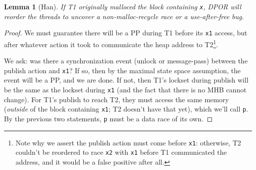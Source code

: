 \documentclass[pldi]{sigplanconf-pldi15}
\newtheorem{lemma}{Lemma}
\begin{document}
\begin{lemma}[Han]
	If T1 originally malloced the block containing {\tt x}, DPOR will reorder the threads to uncover a non-malloc-recycle race or a use-after-free bug.
	\label{lem:han}
\end{lemma}

\begin{proof}
We must guarantee there will be a PP during T1 before its {\tt x1} access, but after whatever action it took to communicate the heap address to T2\footnote{
Note why we assert the publish action must come before {\tt x1}: otherwise, T2 couldn't be reordered to race {\tt x2} with {\tt x1} before T1 communicated the address, and it would be a false positive after all.}.


We ask: was there a synchronization event (unlock or message-pass) between the publish action and {\tt x1}?
If so, then by the maximal state space assumption, the event will be a PP, and we are done.
If not, then  T1's lockset during publish will be the same as the lockset during {\tt x1} (and the fact that there is no MHB cannot change).
For T1's publish to reach T2, they must access the same memory ({\em outside} of the block containing {\tt x1}; T2 doesn't have that yet),
which we'll call {\tt p}.
By the previous two statements, {\tt p} must be a data race of its own.


\end{proof}
\end{document}
